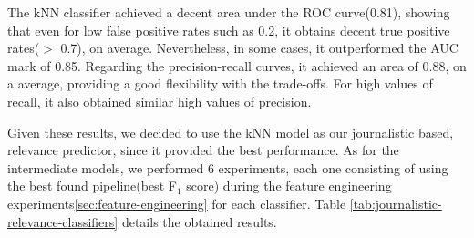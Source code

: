 The kNN classifier achieved a decent area under the ROC curve(0.81), showing that even for low false positive rates such as 0.2, it obtains decent true positive rates($>$ 0.7), on average. Nevertheless, in some cases, it outperformed the AUC mark of 0.85. Regarding the precision-recall curves, it achieved an area of 0.88, on a average, providing a good flexibility with the trade-offs. For high values of recall, it also obtained similar high values of precision. 

Given these results, we decided to use the kNN model as our journalistic based, relevance predictor, since it provided the best performance. As for the intermediate models, we performed 6 experiments, each one consisting of using the best found pipeline(best F$_1$ score) during the feature engineering experiments\ref{sec:feature-engineering} for each classifier. Table \ref{tab:journalistic-relevance-classifiers} details the obtained results.

\begin{table}[H]
\centering
\small
{}
\caption[Results on Predicting Relevance by an Ensemble of Journalistic Classifiers]{Results on Predicting Relevance by an Ensemble of Journalistic  Classifiers}
\label{tab:journalistic-relevance-classifiers}
\end{table}


